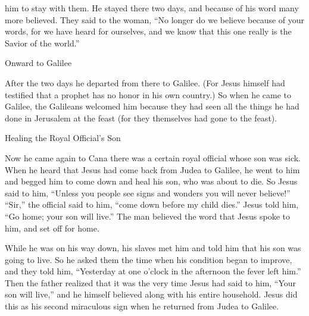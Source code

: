 {him
to stay
with
them.
He
stayed
there
two
days,
and
because of
his
word
many
more
believed.
They said
to the woman,
“No longer
do we believe
because of
your
words,
for
we have heard
for ourselves,
and
we know
that
this one
really
is
the Savior
of the world.”
\par }{\SH Onward to Galilee
\par }{\PP {}After
the two
days
he departed
from there
to
Galilee.
(For
Jesus
himself
had testified
that
a prophet
has
no
honor
in
his own
country.)
So
when
he came
to
Galilee,
the Galileans
welcomed
him
because they had seen
all
the things
he had done
in
Jerusalem
at
the feast
(for
they
themselves
had gone
to
the feast).
\par }{\SH Healing the Royal Official’s Son
\par }{\PP {}Now
he came
again
to
Cana
there was
a
certain
royal official
whose
son
was sick.
When
he heard
that
Jesus
had come back
from
Judea
to
Galilee,
he went
to
him
and
begged
him to
come down
and
heal
his
son,
who was about
to die.
So
Jesus
said
to
him,
“Unless
you
people see
signs
and
wonders
you will
never
believe!”
“Sir,”
the official
said
to
him,
“come down
before
my
child
dies.”
Jesus
told
him,
“Go home;
your
son
will live.”
The man
believed
the word
that
Jesus
spoke
to him,
and
set off for home.
\par }{\PP {}While
he was on
his
way down,
his
slaves
met
him
and told
him that
his
son
was going to live.
So
he asked
them
the time
when
his condition began to improve,
and they told
him,
“Yesterday at one o’clock in the afternoon the fever
left
him.”
Then
the father
realized
that
it was the very time
Jesus
had said
to him,
“Your
son
will live,”
and
he
himself
believed
along with
his
entire
household.
Jesus
did
this
as his second
miraculous sign
when
he returned
from
Judea
to
Galilee.

}
